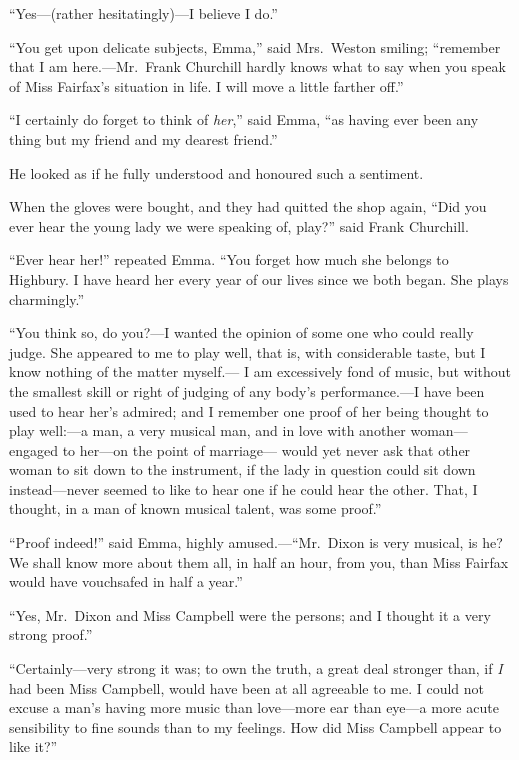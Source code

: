 ``Yes---(rather hesitatingly)---I believe I do.''

``You get upon delicate subjects, Emma,'' said Mrs.\ Weston smiling;
``remember that I am here.---Mr.\ Frank Churchill hardly knows
what to say when you speak of Miss Fairfax's situation in life.
I will move a little farther off.''

``I certainly do forget to think of \emph{her},'' said Emma, ``as having ever
been any thing but my friend and my dearest friend.''

He looked as if he fully understood and honoured such a sentiment.

When the gloves were bought, and they had quitted the shop again,
``Did you ever hear the young lady we were speaking of, play?''
said Frank Churchill.

``Ever hear her!'' repeated Emma.  ``You forget how much she belongs
to Highbury.  I have heard her every year of our lives since we
both began.  She plays charmingly.''

``You think so, do you?---I wanted the opinion of some one who
could really judge.  She appeared to me to play well, that is,
with considerable taste, but I know nothing of the matter myself.---%
I am excessively fond of music, but without the smallest skill
or right of judging of any body's performance.---I have been used
to hear her's admired; and I remember one proof of her being
thought to play well:---a man, a very musical man, and in love
with another woman---engaged to her---on the point of marriage---%
would yet never ask that other woman to sit down to the instrument,
if the lady in question could sit down instead---never seemed
to like to hear one if he could hear the other.  That, I thought,
in a man of known musical talent, was some proof.''

``Proof indeed!'' said Emma, highly amused.---``Mr.\ Dixon is very musical,
is he?  We shall know more about them all, in half an hour, from you,
than Miss Fairfax would have vouchsafed in half a year.''

``Yes, Mr.\ Dixon and Miss Campbell were the persons; and I thought
it a very strong proof.''

``Certainly---very strong it was; to own the truth, a great deal
stronger than, if \emph{I} had been Miss Campbell, would have been at all
agreeable to me.  I could not excuse a man's having more music
than love---more ear than eye---a more acute sensibility to fine
sounds than to my feelings.  How did Miss Campbell appear to like it?''

